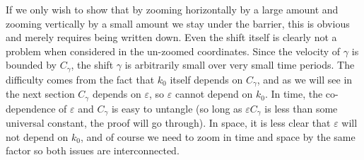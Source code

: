 \documentclass[11pt]{amsart}
\theoremstyle{remark}
\newcommand{\eps}{\varepsilon}
\begin{document}
If we only wish to show that by zooming horizontally by a large amount and zooming vertically by a small amount we stay under the barrier, this is obvious and merely requires being written down.  Even the shift itself is clearly not a problem when considered in the un-zoomed coordinates.  Since the velocity of $\gamma$ is bounded by $C_\gamma$, the shift $\gamma$ is arbitrarily small over very small time periods.  The difficulty comes from the fact that $k_0$ itself depends on $C_\gamma$, and as we will see in the next section $C_\gamma$ depends on $\eps$, so $\eps$ cannot depend on $k_0$.  In time, the co-dependence of $\eps$ and $C_\gamma$ is easy to untangle (so long as $\eps C_\gamma$ is less than some universal constant, the proof will go through).  In space, it is less clear that $\eps$ will not depend on $k_0$, and of course we need to zoom in time and space by the same factor so both issues are interconnected.  
\end{document}
